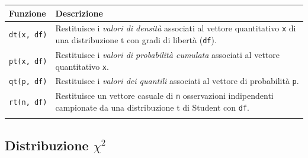 \documentclass[
  ignorenonframetext,
  italian,
  compress, aspectratio=149]{beamer}
\begin{document}
\begin{frame}[fragile]{}
\label{section-24}
\begin{longtable}[]{@{}
  >{\raggedright\arraybackslash}p{}
  >{\raggedright\arraybackslash}p{}@{}}
\toprule\noalign{}
\begin{minipage}[b]{\linewidth}\raggedright
Funzione
\end{minipage} & \begin{minipage}[b]{\linewidth}\raggedright
Descrizione
\end{minipage} \\
\midrule\noalign{}
\endhead
\texttt{dt(x,\ df)} & Restituisce i \emph{valori di densità} associati
al vettore quantitativo \texttt{x} di una distribuzione t con gradi di
libertà (\texttt{df}). \\
\texttt{pt(x,\ df)} & Restituisce i \emph{valori di probabilità
cumulata} associati al vettore quantitativo \texttt{x}. \\
\texttt{qt(p,\ df)} & Restituisce i \emph{valori dei quantili} associati
al vettore di probabilità \texttt{p}. \\
\texttt{rt(n,\ df)} & Restituisce un vettore casuale di \texttt{n}
osservazioni indipendenti campionate da una distribuzione t di Student
con \texttt{df}. \\
\bottomrule\noalign{}
\end{longtable}
\end{frame}

\subsection{\texorpdfstring{Distribuzione
\(\chi^2\)}{Distribuzione \textbackslash chi\^{}2}}\label{distribuzione-chi2}
\end{document}

